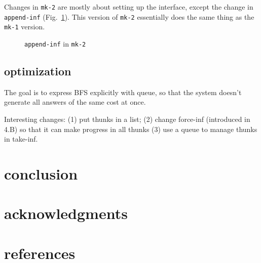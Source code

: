 \documentclass[format=acmlarge, review=true, authordraft=true]{acmart}
\begin{document}
Changes in \texttt{mk-2} are mostly about setting up the interface, except the change in \texttt{append-inf} (Fig.~\ref{append-inf-2}). This version of \texttt{mk-2} essentially does the same thing as the \texttt{mk-1} version. 

\begin{figure}
	 	
	 \caption{\texttt{append-inf} in \texttt{mk-2}}
	 \label{append-inf-2}
\end{figure} 

\subsection{optimization}

The goal is to express BFS explicitly with queue, so that the system doesn't generate all answers of the same cost at once.

Interesting changes: (1) put thunks in a list; (2) change force-inf (introduced in 4.B) so that it can make progress in all thunks (3) use a queue to manage thunks in take-inf.

\section{conclusion}

\section*{acknowledgments}

\section*{references}
\end{document}
